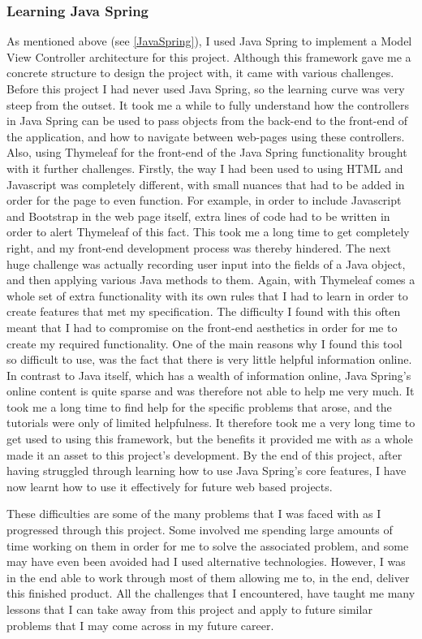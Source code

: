 \subsubsection{Learning Java Spring}
As mentioned above (see \ref{JavaSpring}), I used Java Spring to implement a Model View Controller architecture for this project. Although this framework gave me a concrete structure to design the project with, it came with various challenges. Before this project I had never used Java Spring, so the learning curve was very steep from the outset. It took me a while to fully understand how the controllers in Java Spring can be used to pass objects from the back-end to the front-end of the application, and how to navigate between web-pages using these controllers. Also, using Thymeleaf for the front-end of the Java Spring functionality brought with it further challenges. Firstly, the way I had been used to using HTML and Javascript was completely different, with small nuances that had to be added in order for the page to even function. For example, in order to include Javascript and Bootstrap in the web page itself, extra lines of code had to be written in order to alert Thymeleaf of this fact. This took me a long time to get completely right, and my front-end development process was thereby hindered. The next huge challenge was actually recording user input into the fields of a Java object, and then applying various Java methods to them. Again, with Thymeleaf comes a whole set of extra functionality with its own rules that I had to learn in order to create features that met my specification. The difficulty I found with this often meant that I had to compromise on the front-end aesthetics in order for me to create my required functionality. One of the main reasons why I found this tool so difficult to use, was the fact that there is very little helpful information online. In contrast to Java itself, which has a wealth of information online, Java Spring's online content is quite sparse and was therefore not able to help me very much. It took me a long time to find help for the specific problems that arose, and the tutorials were only of limited helpfulness. It therefore took me a very long time to get used to using this framework, but the benefits it provided me with as a whole made it an asset to this project's development. By the end of this project, after having struggled through learning how to use Java Spring's core features, I have now learnt how to use it effectively for future web based projects.

These difficulties are some of the many problems that I was faced with as I progressed through this project. Some involved me spending large amounts of time working on them in order for me to solve the associated problem, and some may have even been avoided had I used alternative technologies. However, I was in the end able to work through most of them allowing me to, in the end, deliver this finished product. All the challenges that I encountered, have taught me many lessons that I can take away from this project and apply to future similar problems that I may come across in my future career. 

